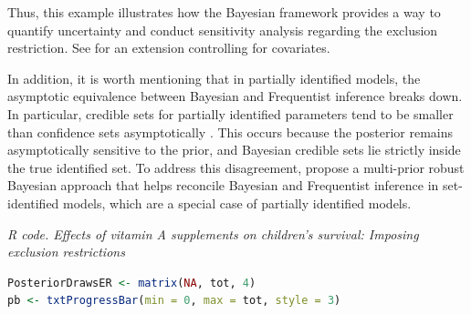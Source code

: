 Thus, this example illustrates how the Bayesian framework provides a way to quantify uncertainty and conduct sensitivity analysis regarding the exclusion restriction. See \cite{hirano2000assessing} for an extension controlling for covariates. 

In addition, it is worth mentioning that in partially identified models, the asymptotic equivalence between Bayesian and Frequentist inference breaks down. In particular, credible sets for partially identified parameters tend to be smaller than confidence sets asymptotically \cite{MoonSchorfheide2012}. This occurs because the posterior remains asymptotically sensitive to the prior, and Bayesian credible sets lie strictly inside the true identified set. To address this disagreement, \cite{Giacomini2021} propose a multi-prior robust Bayesian approach that helps reconcile Bayesian and Frequentist inference in set-identified models, which are a special case of partially identified models.

\begin{tcolorbox}[enhanced,width=4.67in,center upper,
	fontupper=\large\bfseries,drop shadow southwest,sharp corners]
	\textit{R code. Effects of vitamin A supplements on children's survival: Imposing exclusion restrictions}
	\begin{VF}
		\begin{lstlisting}[language=R]
PosteriorDrawsER <- matrix(NA, tot, 4)
pb <- txtProgressBar(min = 0, max = tot, style = 3)
\end{lstlisting}
	\end{VF}
\end{tcolorbox} 

